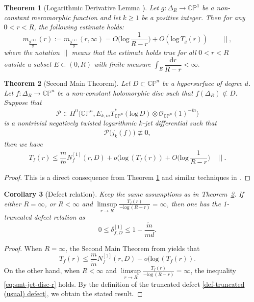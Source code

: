 \documentclass[english, 12pt]{amsart}
\def\log{\mathrm{log}\,}
\theoremstyle{plain}
\newtheorem{thm}{Theorem}[section]
\newtheorem{cor}[thm]{{Corollary}}
\theoremstyle{remark}
\numberwithin{equation}{section}
\theoremstyle{plain}
\theoremstyle{named}
\begin{document}
\begin{thm}[Logarithmic Derivative Lemma \cite{Ru2023}]\label{lem:ldl-disc-r}
	Let $g\colon \Delta_R\rightarrow \mathbb{C}\mathbb{P}^1$ be a non-constant meromorphic function and let $k\geq 1$ be a positive integer. Then for any $0<r<R$, the following estimate holds:
	\[
	m_{\frac{g^{(k)}}{g}}
	(
	r
	)
	:=
	m_{\frac{g^{(k)}}{g}}
	(
	r,\infty
	)
	=
	O\bigg(\log\dfrac{1}{R-r}\bigg)+O(\log T_g(r))\qquad\parallel,
	\]
	where the notation $\parallel$ means that the estimate holds true for all $0<r<R$ outside a subset $E\subset (0,R)$ with finite measure $\int_E\dfrac{\mathrm{d}r}{R-r}<\infty.$
\end{thm}
\begin{thm}[Second Main Theorem] \label{smt from jet}
	Let $D\subset\mathbb{C}\mathbb{P}^n$ be a hypersurface of degree $d$.
	Let $f\colon\Delta_R\rightarrow \mathbb{C}\mathbb{P}^n$ be a non-constant holomorphic disc such that $f(\Delta_R)\not\subset D$. Suppose that
	\[
	\mathscr{P}
	\in
	H^0
	\big(
	\mathbb{C}\mathbb{P}^n,
	E_{k,m}T_{\mathbb{C}\mathbb{P}^n}^*(\log D)
	\otimes
	\mathcal{O}_{\mathbb{C}\mathbb{P}^n}(1)^{-\widetilde{m}}
	\big)
	\]
	is a nontrivial negatively twisted logarithmic $k$-jet differential such that
	\begin{align}
		\label{eq_canPfjets-section2}
		\mathscr{P}\big(j_k(f)
		\big)
		\not\equiv
		0,
	\end{align}
	then we have
	\begin{align}\label{eq:smt-jet-disc-r}
		T_f(r)\leq\dfrac{m}{\widetilde{m}}N^{[1]}_f(r,D)+o(\log (T_f(r))+O\bigg(\log\dfrac{1}{R-r}\bigg)\quad\parallel.
	\end{align}
\end{thm}
\begin{proof}
	This is a direct consequence from Theorem \ref{lem:ldl-disc-r} and similar techniques in \cite[Theorem 3.1]{Huynh-Vu-Xie-2017}.
\end{proof}
\begin{cor}[Defect relation]
	\label{defect relation}
	Keep the same assumptions as in Theorem~\ref{smt from jet}. If either $R=\infty$, or $R<\infty$ and $\limsup\limits_{r\rightarrow R}\frac{T_f(r)}{-\log (R-r)}=\infty$, then one has the 1-truncated defect relation as
	\[
	0\leq \delta^{[1]}_{f,D}\leq 1-\dfrac{\widetilde{m}}{md}.
	\]
\end{cor}
\begin{proof}
	When $R=\infty$, the Second Main Theorem from \cite[Theorem 3.1]{Huynh-Vu-Xie-2017} yields that
	\begin{equation}\label{eq:smt-HVX}
		T_f(r)\leq\dfrac{m}{\widetilde{m}}N^{[1]}_f(r,D)+o(\log (T_f(r)).
	\end{equation}
	On the other hand, when $R<\infty$ and $\limsup\limits_{r\rightarrow R}\frac{T_f(r)}{-\log (R-r)}=\infty$, the inequality \eqref{eq:smt-jet-disc-r} holds. By the definition of the truncated defect \eqref{def-truncated (usual) defect}, we obtain the stated result.
\end{proof}
\end{document}
